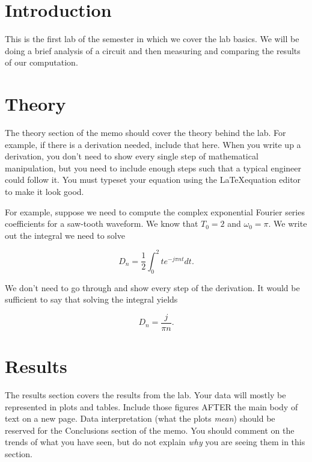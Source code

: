 \documentclass[11pt]{texMemo-gibbons}
\begin{document}
\maketitle

\section{Introduction}
\label{sec:introduction}

This is the first lab of the semester in which we cover
the lab basics. We will be doing a brief analysis of 
a circuit and then measuring and comparing the results of our
computation. 

\section{Theory}
\label{sec:theory}

The theory section of the memo should cover the theory
behind the lab.  For example, if there is a derivation
needed, include that here.  When you write up a derivation,
you don't need to show every single step of mathematical
manipulation, but you need to include enough steps such
that a typical engineer could follow it.  You must typeset
your equation using the \LaTeX  equation editor to make
it look good.

For example, suppose we need to compute the complex
exponential Fourier series coefficients for a saw-tooth
waveform.  We know that $T_0=2$ and $\omega_0=\pi$.
We write out the integral we need to solve

\begin{equation}
  \label{eq:1}
  D_n = \frac{1}{2}\int^2_0 t e^{-j\pi n t} dt.  
\end{equation}

We don't need to go through and show every step of the
derivation.  It would be sufficient to say that solving
the integral yields

\begin{equation}
  \label{eq:2}
  D_n = \frac{j}{\pi n}.
\end{equation}


\section{Results}
\label{sec:results}

The results section covers the results from the lab.
Your data will mostly be represented in plots and tables.
Include those figures AFTER the main body of text on
a new page.  Data interpretation (what the plots \emph{mean})
should be reserved for the Conclusions section of the
memo.  You should comment on the trends of what you
have seen, but do not explain \emph{why} you are seeing
them in this section.
\end{document}
